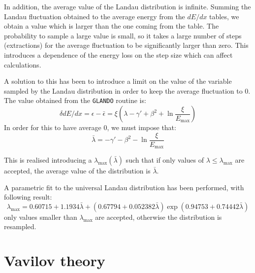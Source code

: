 \documentclass{article}
\newcommand{\Emax}{\ensuremath{E_{\mathrm{max}}}}
\begin{document}
In addition, the average value of the Landau distribution is infinite.
Summing the Landau fluctuation obtained to the average energy from the
$dE/dx$ tables, we obtain a value which is larger than the one coming
from the table.  The probability to sample a large value is small, so
it takes a large number of steps (extractions) for the average
fluctuation to be significantly larger than zero. This introduces a
dependence of the energy loss on the step size which can affect
calculations.

A solution to this has been to introduce a limit on the value of the
variable sampled by the Landau distribution in order to keep the
average fluctuation to 0. The value obtained from the \texttt{GLANDO}
routine is:
\[
\delta dE/dx = \epsilon - \bar{\epsilon} = \xi ( \lambda - \gamma'
+\beta^2 +\ln \frac{\xi}{\Emax})
\]
In order for this to have average 0, we must impose that:
\[
\bar{\lambda} = -\gamma' - \beta^2 -\ln \frac{\xi}{\Emax}
\]

This is realised introducing a $\lambda_{\mathrm{max}}(\bar{\lambda})$
such that if only values of $\lambda \leq \lambda_{\mathrm{max}}$ are
accepted, the average value of the distribution is $\bar{\lambda}$.

A parametric fit to the universal Landau distribution has been
performed, with following result:
\[
\lambda_{\mathrm{max}} = 0.60715 +
     1.1934\bar{\lambda}+(0.67794+0.052382\bar{\lambda})
     \exp(0.94753+0.74442\bar{\lambda})
\]
only values smaller than $\lambda_{\mathrm{max}}$ are accepted, otherwise the
distribution is resampled.



\section{Vavilov theory}
\label{vavref}
\end{document}
